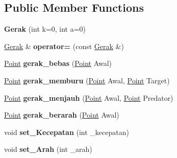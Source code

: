 \subsection*{Public Member Functions}
\begin{DoxyCompactItemize}
\item 
{\bfseries Gerak} (int k=0, int a=0)\hypertarget{class_gerak_a02d91105bf6d068a736b83cb8384771d}{}\label{class_gerak_a02d91105bf6d068a736b83cb8384771d}

\item 
\hyperlink{class_gerak}{Gerak} \& {\bfseries operator=} (const \hyperlink{class_gerak}{Gerak} \&)\hypertarget{class_gerak_a305ed06e393e3e51cfca2ef6e7c76afb}{}\label{class_gerak_a305ed06e393e3e51cfca2ef6e7c76afb}

\item 
\hyperlink{class_point}{Point} {\bfseries gerak\+\_\+bebas} (\hyperlink{class_point}{Point} Awal)\hypertarget{class_gerak_af22d628d35499daa0531c7ec33bc203c}{}\label{class_gerak_af22d628d35499daa0531c7ec33bc203c}

\item 
\hyperlink{class_point}{Point} {\bfseries gerak\+\_\+memburu} (\hyperlink{class_point}{Point} Awal, \hyperlink{class_point}{Point} Target)\hypertarget{class_gerak_ad5580d6323e4c6b4ef8df2b66ae0e3d4}{}\label{class_gerak_ad5580d6323e4c6b4ef8df2b66ae0e3d4}

\item 
\hyperlink{class_point}{Point} {\bfseries gerak\+\_\+menjauh} (\hyperlink{class_point}{Point} Awal, \hyperlink{class_point}{Point} Predator)\hypertarget{class_gerak_a35bd72ee39648608e80e3a6e64529629}{}\label{class_gerak_a35bd72ee39648608e80e3a6e64529629}

\item 
\hyperlink{class_point}{Point} {\bfseries gerak\+\_\+berarah} (\hyperlink{class_point}{Point} Awal)\hypertarget{class_gerak_a523d205606d855b9776ef64f92cc756e}{}\label{class_gerak_a523d205606d855b9776ef64f92cc756e}

\item 
void {\bfseries set\+\_\+\+Kecepatan} (int \+\_\+kecepatan)\hypertarget{class_gerak_aeb2593139ccb712e979d2be884f7b964}{}\label{class_gerak_aeb2593139ccb712e979d2be884f7b964}

\item 
void {\bfseries set\+\_\+\+Arah} (int \+\_\+arah)\hypertarget{class_gerak_a79f2c0d4777b7fdf7828783b4b6ebf59}{}\label{class_gerak_a79f2c0d4777b7fdf7828783b4b6ebf59}


\end{DoxyCompactItemize}
